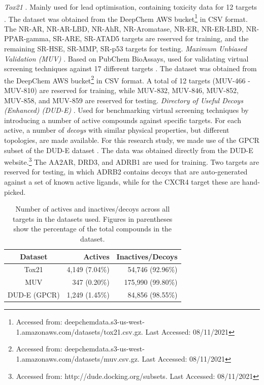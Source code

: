 \documentclass[journal=acscii,manuscript=article]{achemso}
\begin{document}
\textit{Tox21} \cite{huang2016tox21challenge}. Mainly used for lead optimisation, containing toxicity data for 12 targets \citep{tox21}. The dataset was obtained from the DeepChem AWS bucket\footnote{Accessed from: deepchemdata.s3-us-west-1.amazonaws.com/datasets/tox21.csv.gz. Last Accessed: 08/11/2021} in CSV format. The NR-AR, NR-AR-LBD, NR-AhR, NR-Aromatase, NR-ER, NR-ER-LBD, NR-PPAR-gamma, SR-ARE, SR-ATAD5 targets are reserved for training, and the remaining SR-HSE, SR-MMP, SR-p53 targets for testing.
\textit{Maximum Unbiased Validation (MUV)} \citep{rohrer2009maximum}. Based on PubChem BioAssays, used for validating virtual screening techniques against 17 different targets \citep{rohrer2009maximum}. The dataset was obtained from the DeepChem AWS bucket\footnote{Accessed from: deepchemdata.s3-us-west-1.amazonaws.com/datasets/muv.csv.gz. Last Accessed: 08/11/2021} in CSV format. A total of 12 targets (MUV-466 - MUV-810) are reserved for training, while MUV-832, MUV-846, MUV-852, MUV-858, and MUV-859 are reserved for testing.
\textit{Directory of Useful Decoys (Enhanced) (DUD-E)} \cite{mysinger2012directory}. Used for benchmarking virtual screening techniques by introducing a number of active compounds against specific targets. For each active, a number of \textit{decoys} with similar physical properties, but different topologies, are made available. For this research study, we made use of the GPCR subset of the DUD-E dataset \citep{mysinger2012directory}. The data was obtained directly from the DUD-E website.\footnote{Accessed from: http://dude.docking.org/subsets. Last Accessed: 08/11/2021} The AA2AR, DRD3, and ADRB1 are used for training. Two targets are reserved for testing, in which ADRB2 contains decoys that are auto-generated against a set of known active ligands, while for the CXCR4 target these are hand-picked. 

\begin{table}[h]
\centering
\caption{Number of actives and inactives/decoys across all targets in the datasets used. Figures in parentheses show the percentage of the total compounds in the dataset.}
\begin{tabular}{@{}crr@{}}
\hline
Dataset & Actives & Inactives/Decoys \\
\hline
Tox21 & 4,149 (7.04\%) & 54,746 (92.96\%) \\
\hline
MUV & 347 (0.20\%) & 175,990 (99.80\%) \\
\hline
DUD-E (GPCR) & 1,249 (1.45\%) & 84,856 (98.55\%) \\
\end{tabular}
\label{table:datasetimbalance}
\end{table}
\end{document}
